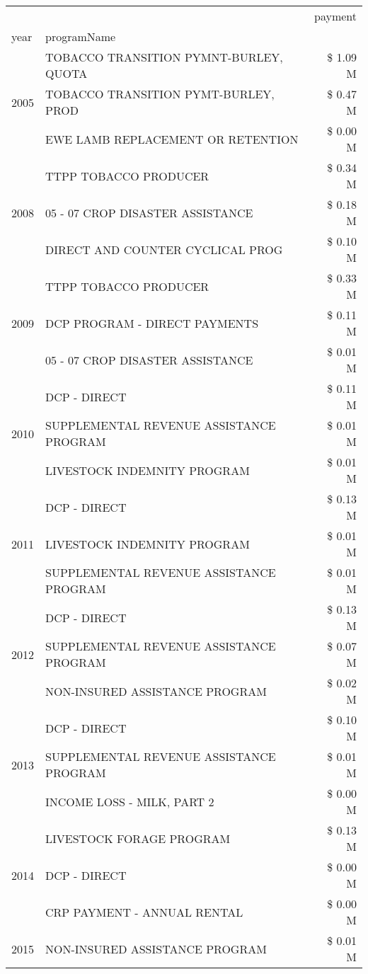 \begin{tabular}{llr}
\toprule
 &  & payment \\
year & programName &  \\
\midrule
\multirow[t]{3}{*}{2005} & TOBACCO TRANSITION PYMNT-BURLEY, QUOTA & \$ 1.09 M \\
 & TOBACCO TRANSITION PYMT-BURLEY, PROD & \$ 0.47 M \\
 & EWE LAMB REPLACEMENT OR RETENTION & \$ 0.00 M \\
\cline{1-3}
\multirow[t]{3}{*}{2008} & TTPP TOBACCO PRODUCER & \$ 0.34 M \\
 & 05 - 07 CROP DISASTER ASSISTANCE & \$ 0.18 M \\
 & DIRECT AND COUNTER CYCLICAL PROG & \$ 0.10 M \\
\cline{1-3}
\multirow[t]{3}{*}{2009} & TTPP TOBACCO PRODUCER & \$ 0.33 M \\
 & DCP PROGRAM - DIRECT PAYMENTS & \$ 0.11 M \\
 & 05 - 07 CROP DISASTER ASSISTANCE & \$ 0.01 M \\
\cline{1-3}
\multirow[t]{3}{*}{2010} & DCP - DIRECT & \$ 0.11 M \\
 & SUPPLEMENTAL REVENUE ASSISTANCE PROGRAM & \$ 0.01 M \\
 & LIVESTOCK INDEMNITY PROGRAM & \$ 0.01 M \\
\cline{1-3}
\multirow[t]{3}{*}{2011} & DCP - DIRECT & \$ 0.13 M \\
 & LIVESTOCK INDEMNITY PROGRAM & \$ 0.01 M \\
 & SUPPLEMENTAL REVENUE ASSISTANCE PROGRAM & \$ 0.01 M \\
\cline{1-3}
\multirow[t]{3}{*}{2012} & DCP - DIRECT & \$ 0.13 M \\
 & SUPPLEMENTAL REVENUE ASSISTANCE PROGRAM & \$ 0.07 M \\
 & NON-INSURED ASSISTANCE PROGRAM & \$ 0.02 M \\
\cline{1-3}
\multirow[t]{3}{*}{2013} & DCP - DIRECT & \$ 0.10 M \\
 & SUPPLEMENTAL REVENUE ASSISTANCE PROGRAM & \$ 0.01 M \\
 & INCOME LOSS - MILK, PART 2 & \$ 0.00 M \\
\cline{1-3}
\multirow[t]{3}{*}{2014} & LIVESTOCK FORAGE PROGRAM & \$ 0.13 M \\
 & DCP - DIRECT & \$ 0.00 M \\
 & CRP PAYMENT - ANNUAL RENTAL & \$ 0.00 M \\
\cline{1-3}
\multirow[t]{3}{*}{2015} & NON-INSURED ASSISTANCE PROGRAM & \$ 0.01 M \\

\end{tabular}
